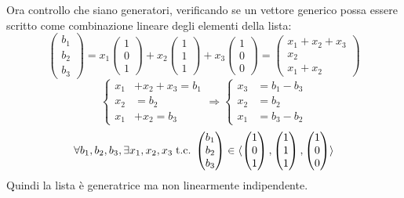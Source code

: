 \documentclass[a4paper,12pt]{article}
\begin{document}
\begin{itemize}
		Ora controllo che siano generatori, verificando se un vettore generico possa essere scritto come combinazione lineare degli elementi della lista:
		\[\begin{pmatrix} b_1 \\ b_2 \\ b_3 \end{pmatrix} = x_1 \begin{pmatrix} 1 \\ 0 \\ 1 \end{pmatrix} + x_2 \begin{pmatrix} 1 \\ 1 \\ 1 \end{pmatrix} + x_3 \begin{pmatrix} 1 \\ 0 \\ 0 \end{pmatrix} = \begin{pmatrix} x_1 + x_2 + x_3 \\ x_2 \\ x_1 + x_2 \end{pmatrix}\]
		\[\left\{\begin{aligned}
			x_1 & + x_2 + x_3 = b_1 \\
			x_2 & = b_2 \\
			x_1 & + x_2 = b_3
 		\end{aligned}\right. \Rightarrow \left\{\begin{aligned}
 		x_3 & = b_1 - b_3 \\
 		x_2 & = b_2 \\
 		x_1 & = b_3 - b_2
 		\end{aligned}\right.\]
 		\[\forall b_1, b_2, b_3, \exists x_1, x_2, x_3 \;\text{t.c.}\; \begin{pmatrix} b_1 \\ b_2 \\ b_3 \end{pmatrix} \in \langle \begin{pmatrix} 1 \\ 0 \\ 1 \end{pmatrix}, \begin{pmatrix} 1 \\ 1 \\ 1 \end{pmatrix}, \begin{pmatrix} 1 \\ 0 \\ 0 \end{pmatrix} \rangle\]
 		Quindi la lista è generatrice ma non linearmente indipendente.
 		

\end{itemize}
\end{document}

